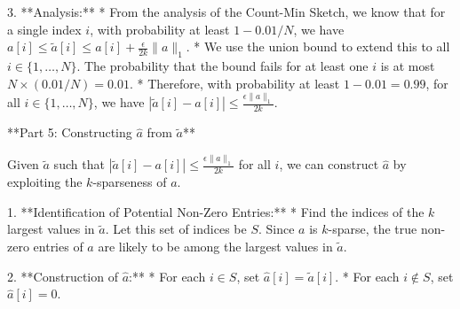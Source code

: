 \begin{enumerate}
\begin{shaded}
3.  **Analysis:**
    * From the analysis of the Count-Min Sketch, we know that for a single index $i$, with probability at least $1 - 0.01/N$, we have $a[i] \le \tilde{a}[i] \le a[i] + \frac{\epsilon}{2k} \|a\|_1$.
    * We use the union bound to extend this to all $i \in \{1, \ldots, N\}$. The probability that the bound fails for at least one $i$ is at most $N \times (0.01/N) = 0.01$.
    * Therefore, with probability at least $1 - 0.01 = 0.99$, for all $i \in \{1, \ldots, N\}$, we have $|\tilde{a}[i] - a[i]| \le \frac{\epsilon \|a\|_1}{2k}$.

**Part 5: Constructing $\hat{a}$ from $\tilde{a}$**

Given $\tilde{a}$ such that $|\tilde{a}[i] - a[i]| \le \frac{\epsilon \|a\|_1}{2k}$ for all $i$, we can construct $\hat{a}$ by exploiting the $k$-sparseness of $a$.

1.  **Identification of Potential Non-Zero Entries:**
    * Find the indices of the $k$ largest values in $\tilde{a}$. Let this set of indices be $S$. Since $a$ is $k$-sparse, the true non-zero entries of $a$ are likely to be among the largest values in $\tilde{a}$.

2.  **Construction of $\hat{a}$:**
    * For each $i \in S$, set $\hat{a}[i] = \tilde{a}[i]$.
    * For each $i \notin S$, set $\hat{a}[i] = 0$.


\end{shaded}
\end{enumerate}
